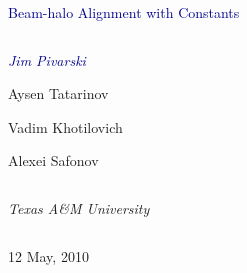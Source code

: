 \documentclass[compress]{beamer}
\begin{document}
\begin{frame}
\vfill
\begin{center}
\textcolor{darkblue}{\Large Beam-halo Alignment with Constants}

\vfill
\begin{columns}
\begin{center}
\large
\textcolor{darkblue}{\it Jim Pivarski}

Aysen Tatarinov

Vadim Khotilovich

Alexei Safonov
\end{center}
\end{columns}

\begin{columns}
\begin{center}
\scriptsize
{\it Texas A\&M University}
\end{center}
\end{columns}

\vfill
12 May, 2010

\end{center}
\end{frame}


\small


\end{document}
